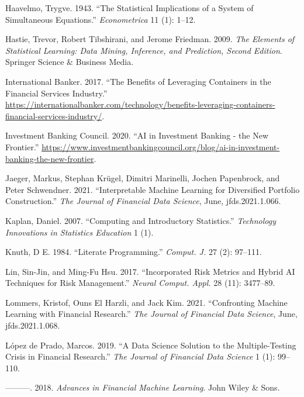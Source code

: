 \documentclass{article}
\begin{document}
\leavevmode\hypertarget{ref-Haavelmo1943}{}%
Haavelmo, Trygve. 1943. ``The Statistical Implications of a System of
Simultaneous Equations.'' \emph{Econometrica} 11 (1): 1--12.

\leavevmode\hypertarget{ref-Hastie2009}{}%
Hastie, Trevor, Robert Tibshirani, and Jerome Friedman. 2009. \emph{The
Elements of Statistical Learning: Data Mining, Inference, and
Prediction, Second Edition}. Springer Science \& Business Media.

\leavevmode\hypertarget{ref-banker2017}{}%
International Banker. 2017. ``The Benefits of Leveraging Containers in
the Financial Services Industry.''
\url{https://internationalbanker.com/technology/benefits-leveraging-containers-financial-services-industry/}.

\leavevmode\hypertarget{ref-IBC2020}{}%
Investment Banking Council. 2020. ``AI in Investment Banking - the New
Frontier.''
\url{https://www.investmentbankingcouncil.org/blog/ai-in-investment-banking-the-new-frontier}.

\leavevmode\hypertarget{ref-Jaeger2021}{}%
Jaeger, Markus, Stephan Krügel, Dimitri Marinelli, Jochen Papenbrock,
and Peter Schwendner. 2021. ``Interpretable Machine Learning for
Diversified Portfolio Construction.'' \emph{The Journal of Financial
Data Science}, June, jfds.2021.1.066.

\leavevmode\hypertarget{ref-Kaplan2007}{}%
Kaplan, Daniel. 2007. ``Computing and Introductory Statistics.''
\emph{Technology Innovations in Statistics Education} 1 (1).

\leavevmode\hypertarget{ref-Knuth1984}{}%
Knuth, D E. 1984. ``Literate Programming.'' \emph{Comput. J.} 27 (2):
97--111.

\leavevmode\hypertarget{ref-Lin2017}{}%
Lin, Sin-Jin, and Ming-Fu Hsu. 2017. ``Incorporated Risk Metrics and
Hybrid AI Techniques for Risk Management.'' \emph{Neural Comput. Appl.}
28 (11): 3477--89.

\leavevmode\hypertarget{ref-Lommers2021}{}%
Lommers, Kristof, Ouns El Harzli, and Jack Kim. 2021. ``Confronting
Machine Learning with Financial Research.'' \emph{The Journal of
Financial Data Science}, June, jfds.2021.1.068.

\leavevmode\hypertarget{ref-De_Prado2019}{}%
López de Prado, Marcos. 2019. ``A Data Science Solution to the
Multiple-Testing Crisis in Financial Research.'' \emph{The Journal of
Financial Data Science} 1 (1): 99--110.

\leavevmode\hypertarget{ref-Lopez_de_Prado2018}{}%
---------. 2018. \emph{Advances in Financial Machine Learning}. John
Wiley \& Sons.
\end{document}
